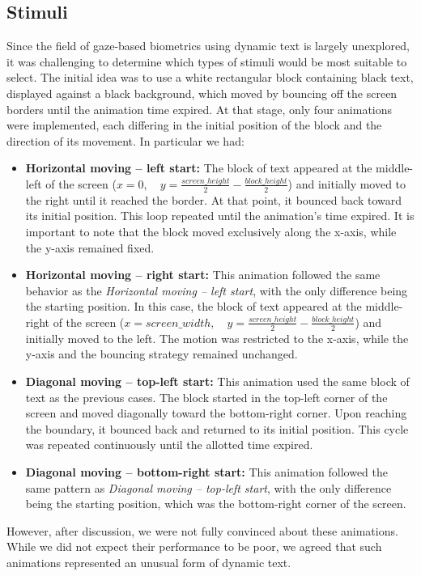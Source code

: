 \documentclass{article}
\begin{document}
\subsection{Stimuli}
\label{subsec:stimuli}

Since the field of gaze-based biometrics using dynamic text is largely unexplored, it was challenging to determine which types of stimuli would be most suitable to select.
The initial idea was to use a white rectangular block containing black text, displayed against a black background, which moved by bouncing off the screen borders until the animation time expired.
At that stage, only four animations were implemented, each differing in the initial position of the block and the direction of its movement.
In particular we had:
\begin{itemize}
    \item \textbf{Horizontal moving – left start:} The block of text appeared at the middle-left of the screen (\( x = 0, \quad y = \frac{screen\_height}{2} - \frac{block\_height}{2} \)) and initially moved to the right until it reached the border. 
    At that point, it bounced back toward its initial position. 
    This loop repeated until the animation's time expired. 
    It is important to note that the block moved exclusively along the x-axis, while the y-axis remained fixed.
    \item \textbf{Horizontal moving – right start:} This animation followed the same behavior as the \textit{Horizontal moving – left start}, with the only difference being the starting position. 
    In this case, the block of text appeared at the middle-right of the screen (\( x = screen\_width, \quad y = \frac{screen\_height}{2} - \frac{block\_height}{2} \)) and initially moved to the left.
    The motion was restricted to the x-axis, while the y-axis and the bouncing strategy remained unchanged.
    \item \textbf{Diagonal moving – top-left start:} This animation used the same block of text as the previous cases. 
    The block started in the top-left corner of the screen and moved diagonally toward the bottom-right corner. 
    Upon reaching the boundary, it bounced back and returned to its initial position. 
    This cycle was repeated continuously until the allotted time expired.
    \item \textbf{Diagonal moving – bottom-right start:} This animation followed the same pattern as \textit{Diagonal moving – top-left start}, with the only difference being the starting position, which was the bottom-right corner of the screen.
\end{itemize}
However, after discussion, we were not fully convinced about these animations. 
While we did not expect their performance to be poor, we agreed that such animations represented an unusual form of dynamic text. 
\end{document}
